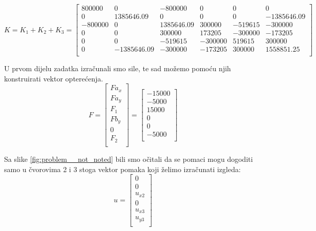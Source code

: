 \documentclass[a4paper,twoside,12pt]{memoir} %
\begin{document}
\begin{equation}
\label{eq:globalna_matrica_krutosti}
    K = K_1 + K_2 + K_3 =
    \begin{bmatrix}
    800000 & 0 & -800000 & 0 & 0 & 0 \\
    0 & 1385646.09 & 0 & 0 & 0 & -1385646.09 \\
    -800000 & 0 & 1385646.09 & 300000 & -519615 & -300000 \\
    0 & 0 & 300000 & 173205 & -300000 & -173205 \\
    0 & 0 & -519615 & -300000 & 519615 & 300000 \\
    0 & -1385646.09 & -300000 & -173205 & 300000 & 1558851.25 \\
    \end{bmatrix}
\end{equation}

U prvom dijelu zadatka izračunali smo sile, te sad možemo pomoću njih konstruirati vektor opterećenja.
\begin{equation}
\label{eq:vektor_opterecenja}
    F =
    \begin{bmatrix}
    Fa_x \\ Fa_y \\ F_1 \\ Fb_y \\ 0 \\ F_2 \\
    \end{bmatrix}
    =
    \begin{bmatrix}
    -15000 \\ -5000 \\ 15000 \\ 0 \\ 0 \\ -5000 \\
    \end{bmatrix}
\end{equation}

Sa slike \ref{fig:problem__not_noted} bili smo očitali da se pomaci mogu dogoditi samo u čvorovima 2 i 3 stoga vektor pomaka koji želimo izračunati izgleda:
\begin{equation}
\label{eq:vektor_pomaka}
    u =
    \begin{bmatrix}
    0 \\ 0 \\ u_{x2} \\ 0 \\ u_{x3} \\ u_{y3} \\
    \end{bmatrix}
\end{equation}
\end{document}
